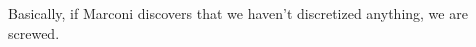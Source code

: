 Basically, if Marconi discovers that we haven't discretized anything, we are screwed.


\clearpage


\clearpage


\clearpage


\clearpage


\clearpage


\clearpage


\clearpage


\clearpage


